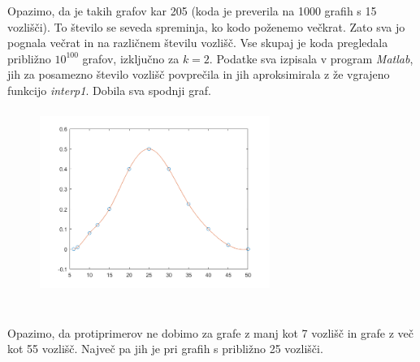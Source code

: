 \documentclass[a4paper]{article}
\begin{document}
Opazimo, da je takih grafov kar 205 (koda je preverila na 1000 grafih s 15 vozlišči). To število se seveda spreminja, ko kodo poženemo večkrat. Zato sva jo pognala večrat in na različnem številu vozlišč. Vse skupaj je koda pregledala približno $10^{100}$ grafov, izključno za $k = 2$. Podatke sva izpisala v program \textit{Matlab}, jih za posamezno število vozlišč povprečila in jih aproksimirala z že vgrajeno funkcijo \textit{interp1}. Dobila sva spodnji graf.
\begin{figure}[h!]
    \centering
    \includegraphics[width=7.5cm, height=6cm]{Slika3}
    \label{fig:mesh1}
\end{figure}\\
Opazimo, da protiprimerov ne dobimo za grafe z manj kot 7 vozlišč in grafe z več kot 55 vozlišč. Največ pa jih je pri grafih s približno 25 vozlišči.
\end{document}

